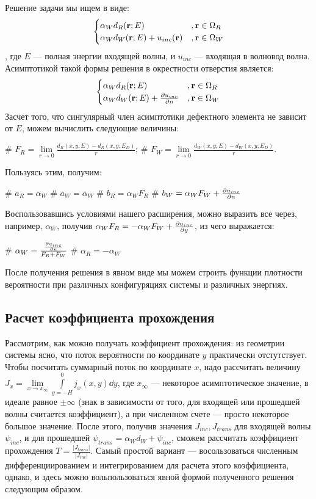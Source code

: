 Решение задачи мы ищем в виде:
\[
\begin{cases}
\alpha_W d_R(\vb{r}; E) &, \vb{r} \in \Omega_R \\
\alpha_W d_W(\vb{r}; E) + u_{inc}(\vb{r})&, \vb{r} \in \Omega_W
\end{cases}
\], где $E$ — полная энергии входящей волны, и $u_{inc}$ — входящая в волновод волна. Асимптотикой такой формы решения в окрестности отверстия является:
\[
\begin{cases}
\alpha_W d_R(\vb{r}; E) &, \vb{r} \in \Omega_R \\
\alpha_W d_W(\vb{r}; E) + \pdv{u_{inc}}{n} (\vb{r}) &, \vb{r} \in \Omega_W
\end{cases}
\]
Засчет того, что сингулярный член асимптотики дефектного элемента не зависит от $E$, можем вычислить следующие величины:
\begin{ilist}
# $F_R = \lim\limits_{r \to 0} \frac{d_R(x, y; E) - d_R(x, y; E_D)}{r}$;
# $F_W = \lim\limits_{r \to 0} \frac{d_W(x, y; E) - d_W(x, y; E_D)}{r}$.
\end{ilist}

Пользуясь этим, получим:
\begin{ilist}
# $a_R = \alpha_W$
# $a_W = \alpha_W$
# $b_R = \alpha_W F_R$
# $b_W = \alpha_W F_W + \pdv{u_{inc}}{n} (\vb{0})$
\end{ilist}

Воспользовавшись условиями нашего расширения, можно выразить все через, например, $\alpha_W$, получив $\alpha_W F_R = - \alpha_W F_W  + \pdv{u_{inc}}{y} (\vb{0})$, из чего выражается:
\begin{ilist}
# $\alpha_W = \frac{\pdv{u_{inc}}{n} (\vb{0})}{F_R + F_W}$
# $\alpha_R = - \alpha_W$
\end{ilist}

После получения решения в явном виде мы можем строить функции плотности вероятности при различных конфигуряциях системы и различных энергиях.

\subsection{Расчет коэффициента прохождения}
Рассмотрим, как можно получать коэффициент прохождения: из геометрии системы ясно, что поток вероятности по координате $y$ практически отстутствует. Чтобы посчитать суммарный поток по координате $x$, надо рассчитать величину $J_x = \lim\limits_{x \to x_\infty} \int\limits_{y = -H}^0 j_x(x, y) \dd{y}$, где $x_\infty$ — некоторое асимптотическое значение, в идеале равное $\pm \infty$ (знак в зависимости от того, для входящей или прошедшей волны считается коэффициент), а при численном счете — просто некоторое большое значение. После этого, получив значения $J_{inc}, J_{trans}$ для входящей волны $\psi_{inc}$, и для прошедшей $\psi_{trans} = \alpha_W d_W + \psi_{inc}$, сможем рассчитать коэффициент прохождения $T = \frac{|J_{trans}|}{|J_{inc}|}$. Самый простой вариант — восользоваться численным дифференциированием и интегрированием для расчета этого коэффициента, однако, и здесь можно вольпользоваться явной формой полученного решения следующим образом.


